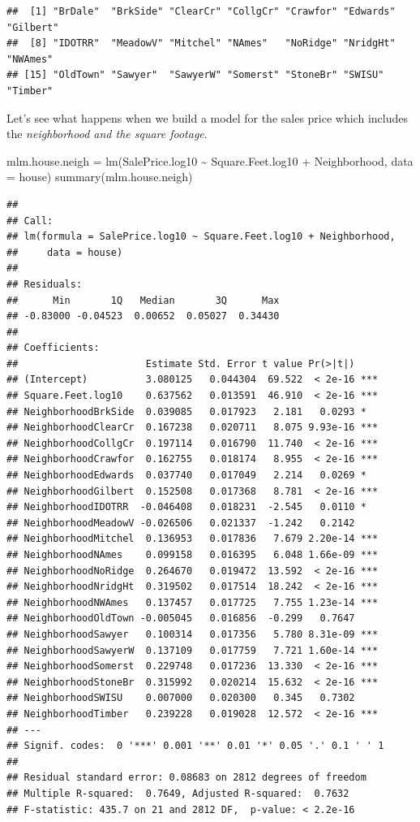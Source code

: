 \documentclass[
]{book}
\newenvironment{Shaded}{\begin{snugshade}}{\end{snugshade}}
\newcommand{\AttributeTok}[1]{\textcolor[rgb]{0.77,0.63,0.00}{#1}}
\newcommand{\FunctionTok}[1]{\textcolor[rgb]{0.00,0.00,0.00}{#1}}
\newcommand{\NormalTok}[1]{#1}
\newcommand{\OtherTok}[1]{\textcolor[rgb]{0.56,0.35,0.01}{#1}}
\newcommand{\SpecialCharTok}[1]{\textcolor[rgb]{0.00,0.00,0.00}{#1}}
\theoremstyle{definition}
\theoremstyle{definition}
\theoremstyle{definition}
\theoremstyle{definition}
\theoremstyle{remark}
\begin{document}
\begin{verbatim}
##  [1] "BrDale"  "BrkSide" "ClearCr" "CollgCr" "Crawfor" "Edwards" "Gilbert"
##  [8] "IDOTRR"  "MeadowV" "Mitchel" "NAmes"   "NoRidge" "NridgHt" "NWAmes" 
## [15] "OldTown" "Sawyer"  "SawyerW" "Somerst" "StoneBr" "SWISU"   "Timber"
\end{verbatim}

Let's see what happens when we build a model for the sales price which includes the \emph{neighborhood and the square footage}.

\begin{Shaded}
\begin{Highlighting}[]
\NormalTok{mlm.house.neigh }\OtherTok{=} \FunctionTok{lm}\NormalTok{(SalePrice.log10 }\SpecialCharTok{\textasciitilde{}}\NormalTok{ Square.Feet.log10 }\SpecialCharTok{+}\NormalTok{ Neighborhood, }\AttributeTok{data =}\NormalTok{ house)}
\FunctionTok{summary}\NormalTok{(mlm.house.neigh)}
\end{Highlighting}
\end{Shaded}

\begin{verbatim}
## 
## Call:
## lm(formula = SalePrice.log10 ~ Square.Feet.log10 + Neighborhood, 
##     data = house)
## 
## Residuals:
##      Min       1Q   Median       3Q      Max 
## -0.83000 -0.04523  0.00652  0.05027  0.34430 
## 
## Coefficients:
##                      Estimate Std. Error t value Pr(>|t|)    
## (Intercept)          3.080125   0.044304  69.522  < 2e-16 ***
## Square.Feet.log10    0.637562   0.013591  46.910  < 2e-16 ***
## NeighborhoodBrkSide  0.039085   0.017923   2.181   0.0293 *  
## NeighborhoodClearCr  0.167238   0.020711   8.075 9.93e-16 ***
## NeighborhoodCollgCr  0.197114   0.016790  11.740  < 2e-16 ***
## NeighborhoodCrawfor  0.162755   0.018174   8.955  < 2e-16 ***
## NeighborhoodEdwards  0.037740   0.017049   2.214   0.0269 *  
## NeighborhoodGilbert  0.152508   0.017368   8.781  < 2e-16 ***
## NeighborhoodIDOTRR  -0.046408   0.018231  -2.545   0.0110 *  
## NeighborhoodMeadowV -0.026506   0.021337  -1.242   0.2142    
## NeighborhoodMitchel  0.136953   0.017836   7.679 2.20e-14 ***
## NeighborhoodNAmes    0.099158   0.016395   6.048 1.66e-09 ***
## NeighborhoodNoRidge  0.264670   0.019472  13.592  < 2e-16 ***
## NeighborhoodNridgHt  0.319502   0.017514  18.242  < 2e-16 ***
## NeighborhoodNWAmes   0.137457   0.017725   7.755 1.23e-14 ***
## NeighborhoodOldTown -0.005045   0.016856  -0.299   0.7647    
## NeighborhoodSawyer   0.100314   0.017356   5.780 8.31e-09 ***
## NeighborhoodSawyerW  0.137109   0.017759   7.721 1.60e-14 ***
## NeighborhoodSomerst  0.229748   0.017236  13.330  < 2e-16 ***
## NeighborhoodStoneBr  0.315992   0.020214  15.632  < 2e-16 ***
## NeighborhoodSWISU    0.007000   0.020300   0.345   0.7302    
## NeighborhoodTimber   0.239228   0.019028  12.572  < 2e-16 ***
## ---
## Signif. codes:  0 '***' 0.001 '**' 0.01 '*' 0.05 '.' 0.1 ' ' 1
## 
## Residual standard error: 0.08683 on 2812 degrees of freedom
## Multiple R-squared:  0.7649, Adjusted R-squared:  0.7632 
## F-statistic: 435.7 on 21 and 2812 DF,  p-value: < 2.2e-16
\end{verbatim}
\end{document}
